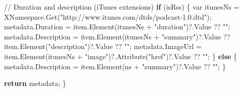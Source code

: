 \documentclass[
  letterpaper,
  DIV=11,
  numbers=noendperiod]{scrartcl}
\newenvironment{Shaded}{\begin{snugshade}}{\end{snugshade}}
\newcommand{\CommentTok}[1]{\textcolor[rgb]{0.37,0.37,0.37}{#1}}
\newcommand{\DataTypeTok}[1]{\textcolor[rgb]{0.68,0.00,0.00}{#1}}
\newcommand{\FunctionTok}[1]{\textcolor[rgb]{0.28,0.35,0.67}{#1}}
\newcommand{\KeywordTok}[1]{\textcolor[rgb]{0.00,0.23,0.31}{\textbf{#1}}}
\newcommand{\NormalTok}[1]{\textcolor[rgb]{0.00,0.23,0.31}{#1}}
\newcommand{\OperatorTok}[1]{\textcolor[rgb]{0.37,0.37,0.37}{#1}}
\newcommand{\StringTok}[1]{\textcolor[rgb]{0.13,0.47,0.30}{#1}}
\begin{document}
\begin{Shaded}
\begin{Highlighting}[]
        \CommentTok{// Duration and description (iTunes extensions)}
        \KeywordTok{if} \OperatorTok{(}\NormalTok{isRss}\OperatorTok{)}
        \OperatorTok{\{}
            \DataTypeTok{var}\NormalTok{ itunesNs }\OperatorTok{=}\NormalTok{ XNamespace}\OperatorTok{.}\FunctionTok{Get}\OperatorTok{(}\StringTok{"http://www.itunes.com/dtds/podcast{-}1.0.dtd"}\OperatorTok{);}
\NormalTok{            metadata}\OperatorTok{.}\FunctionTok{Duration} \OperatorTok{=}\NormalTok{ item}\OperatorTok{.}\FunctionTok{Element}\OperatorTok{(}\NormalTok{itunesNs }\OperatorTok{+} \StringTok{"duration"}\OperatorTok{)?.}\FunctionTok{Value} \OperatorTok{??} \StringTok{""}\OperatorTok{;}
\NormalTok{            metadata}\OperatorTok{.}\FunctionTok{Description} \OperatorTok{=}\NormalTok{ item}\OperatorTok{.}\FunctionTok{Element}\OperatorTok{(}\NormalTok{itunesNs }\OperatorTok{+} \StringTok{"summary"}\OperatorTok{)?.}\FunctionTok{Value} 
                                \OperatorTok{??}\NormalTok{ item}\OperatorTok{.}\FunctionTok{Element}\OperatorTok{(}\StringTok{"description"}\OperatorTok{)?.}\FunctionTok{Value} \OperatorTok{??} \StringTok{""}\OperatorTok{;}
\NormalTok{            metadata}\OperatorTok{.}\FunctionTok{ImageUrl} \OperatorTok{=}\NormalTok{ item}\OperatorTok{.}\FunctionTok{Element}\OperatorTok{(}\NormalTok{itunesNs }\OperatorTok{+} \StringTok{"image"}\OperatorTok{)?.}\FunctionTok{Attribute}\OperatorTok{(}\StringTok{"href"}\OperatorTok{)?.}\FunctionTok{Value} \OperatorTok{??} \StringTok{""}\OperatorTok{;}
        \OperatorTok{\}}
        \KeywordTok{else}
        \OperatorTok{\{}
\NormalTok{            metadata}\OperatorTok{.}\FunctionTok{Description} \OperatorTok{=}\NormalTok{ item}\OperatorTok{.}\FunctionTok{Element}\OperatorTok{(}\NormalTok{ns }\OperatorTok{+} \StringTok{"summary"}\OperatorTok{)?.}\FunctionTok{Value} \OperatorTok{??} \StringTok{""}\OperatorTok{;}
        \OperatorTok{\}}

        \KeywordTok{return}\NormalTok{ metadata}\OperatorTok{;}
    \OperatorTok{\}}


\end{Highlighting}
\end{Shaded}
\end{document}
